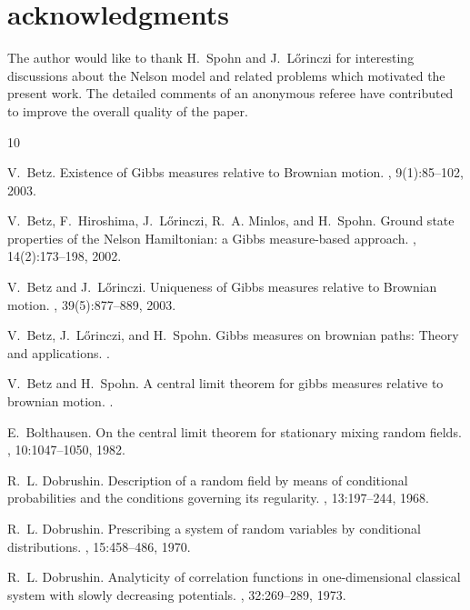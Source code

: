\documentclass[a4paper,12pt,reqno]{amsart}
\begin{document}
 
\section*{acknowledgments}
  The author would like to thank H.~Spohn and J.~L\H{o}rinczi for
  interesting discussions about the Nelson model and related problems
  which motivated the present work.
The detailed comments of an anonymous referee have contributed to improve the overall quality of the paper.



%
%
\begin{thebibliography}{10}

V.~Betz.
\newblock Existence of {G}ibbs measures relative to {B}rownian motion.
, 9(1):85--102, 2003.

V.~Betz, F.~Hiroshima, J.~L{\H{o}}rinczi, R.~A. Minlos, and H.~Spohn.
\newblock Ground state properties of the {N}elson {H}amiltonian: a {G}ibbs
  measure-based approach.
, 14(2):173--198, 2002.

V.~Betz and J.~L{\H{o}}rinczi.
\newblock Uniqueness of {G}ibbs measures relative to {B}rownian motion.
, 39(5):877--889,
  2003.

V.~Betz, J.~L{\H{o}}rinczi, and H.~Spohn.
\newblock Gibbs measures on brownian paths: Theory and applications.
.

V.~Betz and H.~Spohn.
\newblock A central limit theorem for gibbs measures relative to brownian
  motion.
.

E.~Bolthausen.
\newblock On the central limit theorem for stationary mixing random fields.
, 10:1047--1050, 1982.

R.~L. Dobrushin.
\newblock Description of a random field by means of conditional probabilities
  and the conditions governing its regularity.
, 13:197--244, 1968.

R.~L. Dobrushin.
\newblock Prescribing a system of random variables by conditional
  distributions.
, 15:458--486, 1970.

R.~L. Dobrushin.
\newblock Analyticity of correlation functions in one-dimensional classical
  system with slowly decreasing potentials.
, 32:269--289, 1973.


\end{thebibliography}
\end{document}
